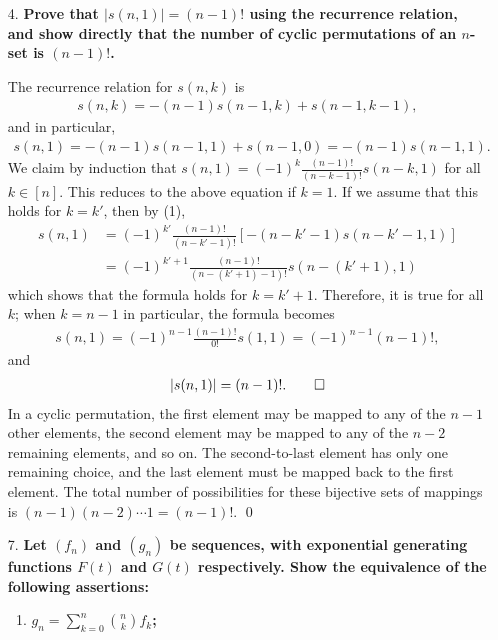 \documentclass[a4paper,12pt]{article}
\begin{document}
\begin{enumerate}
    \item[4.]
        \boldmath
        \textbf{Prove that $|s(n, 1)| = (n - 1)!$ using the recurrence relation, and show directly that the number of cyclic permutations of an $n$-set is $(n - 1)!$.} \par
        \unboldmath
        The recurrence relation for $s(n, k)$ is
        \begin{align*}
            s(n, k) = -(n - 1)s(n - 1, k) + s(n - 1, k - 1),
        \end{align*}
        and in particular,
        \begin{align}
            s(n, 1) = -(n - 1)s(n - 1, 1) + s(n - 1, 0) = -(n - 1)s(n - 1, 1).
        \end{align}
        We claim by induction that $s(n, 1) = (-1)^k \frac{(n - 1)!}{(n - k - 1)!} s(n - k, 1)$ for all $k \in [n]$. This reduces to the above equation if $k = 1$. If we assume that this holds for $k = k'$, then by (1),
        \begin{align*}
            s(n, 1) &= (-1)^{k'} \frac{(n - 1)!}{(n - k' - 1)!} [-(n - k' - 1)s(n - k' - 1, 1)] \\
            &= (-1)^{k' + 1} \frac{(n - 1)!}{(n - (k' + 1) - 1)!} s(n - (k' + 1), 1)
        \end{align*}
        which shows that the formula holds for $k = k' + 1$. Therefore, it is true for all $k$; when $k = n - 1$ in particular, the formula becomes
        \begin{align*}
            s(n, 1) = (-1)^{n - 1} \frac{(n - 1)!}{0!} s(1, 1) = (-1)^{n - 1} (n - 1)!,
        \end{align*}
        and
        \begin{align*}
            |s(n, 1)| = (n - 1)!. \qed
        \end{align*}
        In a cyclic permutation, the first element may be mapped to any of the $n - 1$ other elements, the second element may be mapped to any of the $n - 2$ remaining elements, and so on. The second-to-last element has only one remaining choice, and the last element must be mapped back to the first element. The total number of possibilities for these bijective sets of mappings is $(n - 1)(n - 2) \cdots 1 = (n - 1)!$. \qed

    \item[7.]
        \boldmath
        \textbf{Let $(f_n)$ and $(g_n)$ be sequences, with exponential generating functions $F(t)$ and $G(t)$ respectively. Show the equivalence of the following assertions:} \par
        \begin{enumerate}
            \item
                \textbf{$g_n = \sum_{k = 0}^n \binom{n}{k} f_k$;} \par


\end{enumerate}
\end{enumerate}
\end{document}
